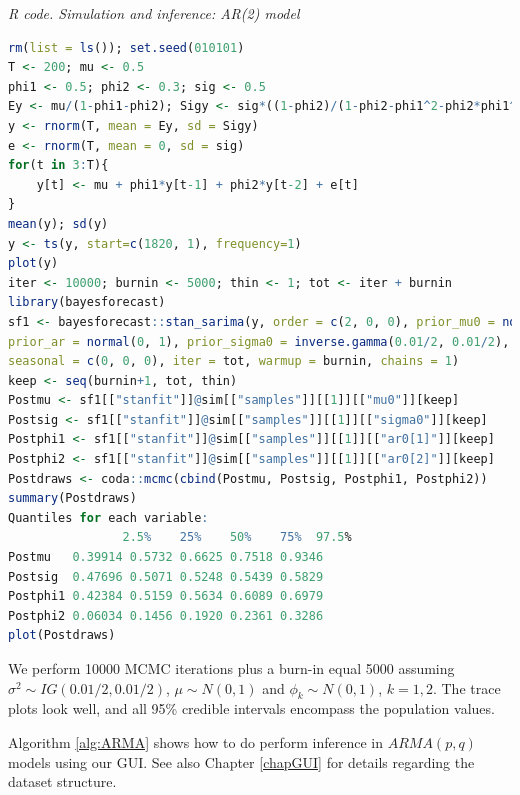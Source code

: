 \begin{tcolorbox}[enhanced,width=4.67in,center upper,
	fontupper=\large\bfseries,drop shadow southwest,sharp corners]
	\textit{R code. Simulation and inference: AR(2) model}
	\begin{VF}
		\begin{lstlisting}[language=R]
rm(list = ls()); set.seed(010101)
T <- 200; mu <- 0.5 
phi1 <- 0.5; phi2 <- 0.3; sig <- 0.5
Ey <- mu/(1-phi1-phi2); Sigy <- sig*((1-phi2)/(1-phi2-phi1^2-phi2*phi1^2-phi2^2+phi2^3))^0.5 
y <- rnorm(T, mean = Ey, sd = Sigy)
e <- rnorm(T, mean = 0, sd = sig)
for(t in 3:T){
	y[t] <- mu + phi1*y[t-1] + phi2*y[t-2] + e[t]
}
mean(y); sd(y)
y <- ts(y, start=c(1820, 1), frequency=1)
plot(y)
iter <- 10000; burnin <- 5000; thin <- 1; tot <- iter + burnin
library(bayesforecast)
sf1 <- bayesforecast::stan_sarima(y, order = c(2, 0, 0), prior_mu0 = normal(0, 1),
prior_ar = normal(0, 1), prior_sigma0 = inverse.gamma(0.01/2, 0.01/2),
seasonal = c(0, 0, 0), iter = tot, warmup = burnin, chains = 1)
keep <- seq(burnin+1, tot, thin)
Postmu <- sf1[["stanfit"]]@sim[["samples"]][[1]][["mu0"]][keep]
Postsig <- sf1[["stanfit"]]@sim[["samples"]][[1]][["sigma0"]][keep]
Postphi1 <- sf1[["stanfit"]]@sim[["samples"]][[1]][["ar0[1]"]][keep]
Postphi2 <- sf1[["stanfit"]]@sim[["samples"]][[1]][["ar0[2]"]][keep]
Postdraws <- coda::mcmc(cbind(Postmu, Postsig, Postphi1, Postphi2))
summary(Postdraws)
Quantiles for each variable:
            	2.5%    25%    50%    75%  97.5%
Postmu   0.39914 0.5732 0.6625 0.7518 0.9346
Postsig  0.47696 0.5071 0.5248 0.5439 0.5829
Postphi1 0.42384 0.5159 0.5634 0.6089 0.6979
Postphi2 0.06034 0.1456 0.1920 0.2361 0.3286
plot(Postdraws)
\end{lstlisting}
	\end{VF}
\end{tcolorbox}
We perform 10000 MCMC iterations plus a burn-in equal 5000 assuming $\sigma^2\sim IG(0.01/2, 0.01/2)$, $\mu\sim N(0, 1)$ and $\phi_k\sim N(0, 1)$, $k=1,2$. The trace plots look well, and all 95\% credible intervals encompass the population values.

Algorithm \ref{alg:ARMA} shows how to do perform inference in $ARMA(p,q)$ models using our GUI. See also Chapter \ref{chapGUI} for details regarding the dataset structure. 

